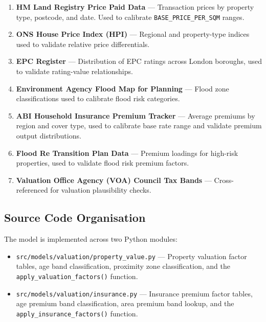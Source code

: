 \documentclass[11pt,a4paper]{article}
\begin{document}
\begin{enumerate}
    \item \textbf{HM Land Registry Price Paid Data} --- Transaction prices
          by property type, postcode, and date. Used to calibrate
          \texttt{BASE\_PRICE\_PER\_SQM} ranges.
    \item \textbf{ONS House Price Index (HPI)} --- Regional and
          property-type indices used to validate relative price
          differentials.
    \item \textbf{EPC Register} --- Distribution of EPC ratings across
          London boroughs, used to validate rating-value relationships.
    \item \textbf{Environment Agency Flood Map for Planning} --- Flood
          zone classifications used to calibrate flood risk categories.
    \item \textbf{ABI Household Insurance Premium Tracker} --- Average
          premiums by region and cover type, used to calibrate base rate
          range and validate premium output distributions.
    \item \textbf{Flood Re Transition Plan Data} --- Premium loadings for
          high-risk properties, used to validate flood risk premium factors.
    \item \textbf{Valuation Office Agency (VOA) Council Tax Bands} ---
          Cross-referenced for valuation plausibility checks.
\end{enumerate}


\mkmimplementation

\subsection{Source Code Organisation}

The model is implemented across two Python modules:

\begin{itemize}
    \item \texttt{src/models/valuation/property\_value.py} --- Property
          valuation factor tables, age band classification, proximity zone
          classification, and the \texttt{apply\_valuation\_factors()}
          function.
    \item \texttt{src/models/valuation/insurance.py} --- Insurance premium
          factor tables, age premium band classification, area premium band
          lookup, and the \texttt{apply\_insurance\_factors()} function.
\end{itemize}
\end{document}
